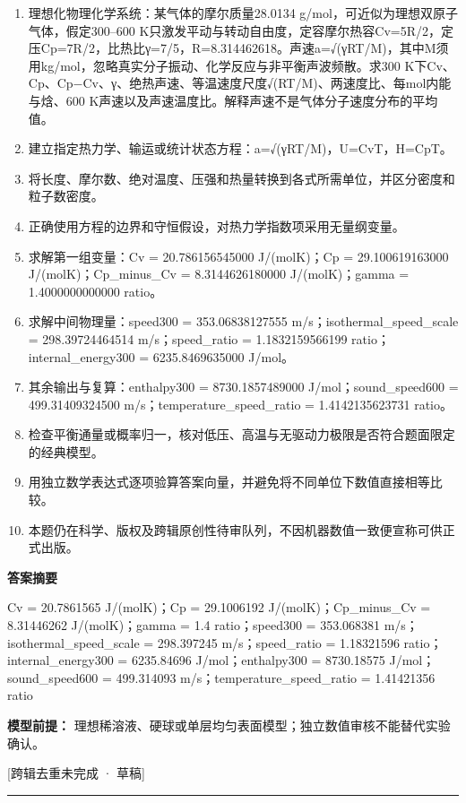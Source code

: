 \documentclass[UTF8,11pt,a4paper]{ctexart}
\begin{document}
\begin{enumerate}
\item 理想化物理化学系统：某气体的摩尔质量28.0134 g/mol，可近似为理想双原子气体，假定300–600 K只激发平动与转动自由度，定容摩尔热容Cv=5R/2，定压Cp=7R/2，比热比γ=7/5，R=8.314462618。声速a=√(γRT/M)，其中M须用kg/mol，忽略真实分子振动、化学反应与非平衡声波频散。求300 K下Cv、Cp、Cp−Cv、γ、绝热声速、等温速度尺度√(RT/M)、两速度比、每mol内能与焓、600 K声速以及声速温度比。解释声速不是气体分子速度分布的平均值。
\item 建立指定热力学、输运或统计状态方程：a=√(γRT/M)，U=CvT，H=CpT。
\item 将长度、摩尔数、绝对温度、压强和热量转换到各式所需单位，并区分密度和粒子数密度。
\item 正确使用方程的边界和守恒假设，对热力学指数项采用无量纲变量。
\item 求解第一组变量：Cv = 20.786156545000 J/(molK)；Cp = 29.100619163000 J/(molK)；Cp\_minus\_Cv = 8.3144626180000 J/(molK)；gamma = 1.4000000000000 ratio。
\item 求解中间物理量：speed300 = 353.06838127555 m/s；isothermal\_speed\_scale = 298.39724464514 m/s；speed\_ratio = 1.1832159566199 ratio；internal\_energy300 = 6235.8469635000 J/mol。
\item 其余输出与复算：enthalpy300 = 8730.1857489000 J/mol；sound\_speed600 = 499.31409324500 m/s；temperature\_speed\_ratio = 1.4142135623731 ratio。
\item 检查平衡通量或概率归一，核对低压、高温与无驱动力极限是否符合题面限定的经典模型。
\item 用独立数学表达式逐项验算答案向量，并避免将不同单位下数值直接相等比较。
\item 本题仍在科学、版权及跨辑原创性待审队列，不因机器数值一致便宣称可供正式出版。
\end{enumerate}
\noindent\textbf{答案摘要}\par
Cv = 20.7861565 J/(molK)；Cp = 29.1006192 J/(molK)；Cp\_minus\_Cv = 8.31446262 J/(molK)；gamma = 1.4 ratio；speed300 = 353.068381 m/s；isothermal\_speed\_scale = 298.397245 m/s；speed\_ratio = 1.18321596 ratio；internal\_energy300 = 6235.84696 J/mol；enthalpy300 = 8730.18575 J/mol；sound\_speed600 = 499.314093 m/s；temperature\_speed\_ratio = 1.41421356 ratio\par
\noindent\textbf{模型前提：}
理想稀溶液、硬球或单层均匀表面模型；独立数值审核不能替代实验确认。\par
\noindent\textcolor{red!65!black}{[跨辑去重未完成 · 草稿]} \par
\medskip\hrule\medskip
{}
\end{document}
